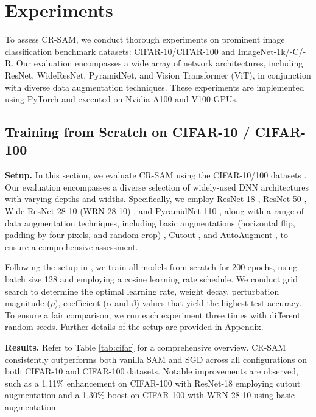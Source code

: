 \documentclass[letterpaper]{article} %
\theoremstyle{plain}
\theoremstyle{definition}
\begin{document}
\section{Experiments}
\label{sec:experiments}

To assess CR-SAM, we conduct thorough experiments on prominent image classification benchmark datasets: CIFAR-10/CIFAR-100 and ImageNet-1k/-C/-R. Our evaluation encompasses a wide array of network architectures, including ResNet, WideResNet, PyramidNet, and Vision Transformer (ViT), in conjunction with diverse data augmentation techniques. These experiments are implemented using PyTorch and executed on Nvidia A100 and V100 GPUs.

\subsection{Training from Scratch on CIFAR-10 / CIFAR-100}
\label{subsec: cifar}

\textbf{Setup.}
In this section, we evaluate CR-SAM using the CIFAR-10/100 datasets \cite{krizhevsky2009learning}. Our evaluation encompasses a diverse selection of widely-used DNN architectures with varying depths and widths. Specifically, we employ ResNet-18 \cite{he2016deep}, ResNet-50 \cite{he2016deep}, Wide ResNet-28-10 (WRN-28-10) \cite{zagoruyko2016wide}, and PyramidNet-110 \cite{han2017deep}, along with a range of data augmentation techniques, including basic augmentations (horizontal flip, padding by four pixels, and random crop) \cite{foret2021sharpnessaware}, Cutout \cite{devries2017improved}, and AutoAugment \cite{cubuk2018autoaugment}, to ensure a comprehensive assessment.

Following the setup in \cite{liu2022random, du2022sharpness}, we train all models from scratch for 200 epochs, using batch size 128 and employing a cosine learning rate schedule. We conduct grid search to determine the optimal learning rate, weight decay, perturbation magnitude ($\rho$), coefficient ($\alpha$ and $\beta$) values that yield the highest test accuracy. To ensure a fair comparison, we run each experiment three times with different random seeds. Further details of the setup are provided in Appendix.

\textbf{Results.}
Refer to Table \ref{tab:cifar} for a comprehensive overview. CR-SAM consistently outperforms both vanilla SAM and SGD across all configurations on both CIFAR-10 and CIFAR-100 datasets. Notable improvements are observed, such as a 1.11\% enhancement on CIFAR-100 with ResNet-18 employing cutout augmentation and a 1.30\% boost on CIFAR-100 with WRN-28-10 using basic augmentation.
\end{document}
